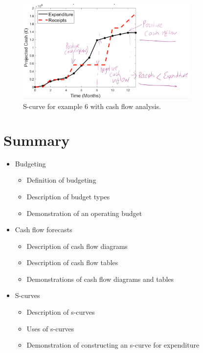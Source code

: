 \begin{figure}[H]
    \centering
    \includegraphics[width = 0.8\textwidth]{img/figure62.png}
    \caption{S-curve for example 6 with cash flow analysis.}
\end{figure}
\section{Summary}
\begin{itemize}
    \item Budgeting
          \begin{itemize}
              \item Definition of budgeting
              \item Description of budget types
              \item Demonstration of an operating budget
          \end{itemize}
    \item Cash flow forecasts
          \begin{itemize}
              \item Description of cash flow diagrams
              \item Description of cash flow tables
              \item Demonstrations of cash flow diagrams and tables
          \end{itemize}
    \item S-curves
          \begin{itemize}
              \item Description of s-curves
              \item Uses of s-curves
              \item Demonstration of constructing an s-curve for expenditure
          \end{itemize}
\end{itemize}